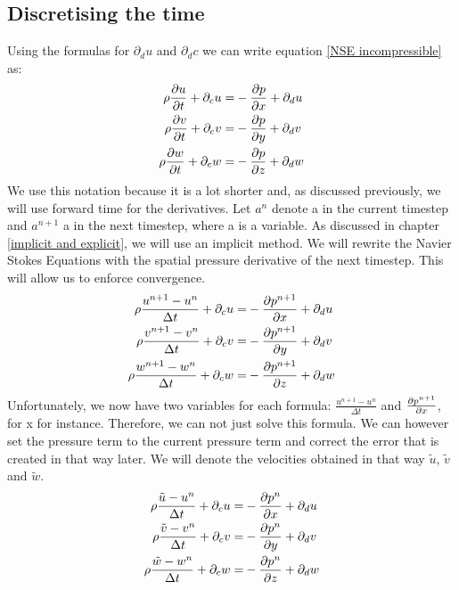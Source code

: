 \documentclass{article}
\begin{document}
\subsection{Discretising the time}

Using the formulas for \(\partial _du\) and \(\partial _dc\) we can write equation \ref{NSE incompressible} as\cite{MAC}:
\begin{equation}
\begin{split}
  \rho \pdv{u}{t} + \partial _cu=&-\pdv{p}{x}+\partial _du\\
  \rho \pdv{v}{t} + \partial _cv=&-\pdv{p}{y}+\partial _dv\\
  \rho \pdv{w}{t} + \partial _cw=&-\pdv{p}{z}+\partial _dw
\end{split}
\end{equation}\label{short NSE}
We use this notation because it is a lot shorter and, as discussed previously, we will use forward time for the derivatives. Let \(a^n\) denote a in the current timestep and \(a^{n+1}\) a in the next timestep, where a is a variable. As discussed in chapter \ref{implicit and explicit}, we will use an implicit method. We will rewrite the Navier Stokes Equations with the spatial pressure derivative of the next timestep. This will allow us to enforce convergence. \cite{MAC}
\begin{equation}
\begin{split}
  \rho \frac{u^{n+1}-u^n}{\Delta t} + \partial _cu=&-\pdv{p^{n+1}}{x}+\partial _du\\
  \rho \frac{v^{n+1}-v^n}{\Delta t} + \partial _cv=&-\pdv{p^{n+1}}{y}+\partial _dv\\
  \rho \frac{w^{n+1}-w^n}{\Delta t} + \partial _cw=&-\pdv{p^{n+1}}{z}+\partial _dw
\end{split}\label{time discretised NSE}
\end{equation} 
Unfortunately, we now have two variables for each formula: \(\frac{u^{n+1}-u^n}{\Delta t}\) and \(\pdv{p^{n+1}}{x}\), for x for instance. Therefore, we can not just solve this formula. We can however set the pressure term to the current pressure term and correct the error that is created in that way later. We will denote the velocities obtained in that way \(\tilde{u}\), \(\tilde{v}\) and \(\tilde{w}\)\cite{MAC}.
\begin{equation}
\begin{split}
  \rho \frac{\tilde{u}-u^n}{\Delta t} + \partial _cu=&-\pdv{p^{n}}{x}+\partial _du\\
  \rho \frac{\tilde{v}-v^n}{\Delta t} + \partial _cv=&-\pdv{p^{n}}{y}+\partial _dv\\
  \rho \frac{\tilde{w}-w^n}{\Delta t} + \partial _cw=&-\pdv{p^{n}}{z}+\partial _dw
\end{split}\label{guess NSE}
\end{equation} 
\end{document}
